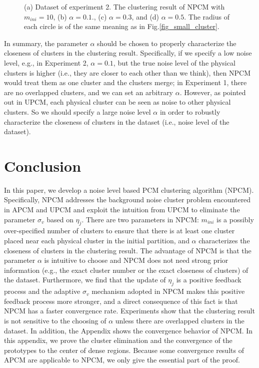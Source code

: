 \documentclass[conference]{IEEEtran}
\theoremstyle{definition}
\begin{document}
\begin{figure}[tb]
\caption{(a) Dataset of experiment 2. The clustering result of NPCM with $m_{ini}=10$, (b) $\alpha=0.1.$, (c) $\alpha=0.3$, and (d) $\alpha=0.5$.
The radius of each circle is of the same meaning as in Fig.\ref{fig_small_cluster}.}
\label{fig_close_cluster}
\end{figure}

In summary, the parameter $\alpha$ should be chosen to  properly characterize the closeness of clusters in the clustering result. Specifically, if we specify a low noise level, e.g., in Experiment 2, $\alpha=0.1$, but the true noise level of the physical clusters is higher (i.e., they are closer to each other than we think), then NPCM would treat them as one cluster and the clusters merge; in Experiment 1, there are no overlapped clusters, and we can set an arbitrary $\alpha$.
However, as pointed out in UPCM, each physical cluster can be seen as noise to other physical clusters. So we should specify a large noise level $\alpha$ in order to robustly characterize the closeness of clusters in the dataset (i.e., noise level of the dataset).
\section{Conclusion}
\label{sec-5}
In this paper, we develop a noise level based PCM clustering algorithm (NPCM). Specifically, NPCM addresses the background noise cluster problem encountered in APCM and UPCM and exploit the intuition from UPCM to eliminate the parameter $\sigma_v$ based on $\eta_j$.
There are two parameters in NPCM: $m_{ini}$ is a possibly over-specified number of clusters to ensure that there is at least one cluster placed near each physical cluster in the initial partition, and $\alpha$ characterizes the closeness of clusters in the clustering result.
The advantage of NPCM is that the parameter $\alpha$ is intuitive to choose and NPCM does not need strong prior information (e.g., the exact cluster number or the exact closeness of clusters) of the dataset.
Furthermore, we find that the update of $\eta_j$ is a positive feedback process and the adaptive $\sigma_v$ mechanism adopted in NPCM makes this positive feedback process more stronger, and a direct consequence of this fact is that NPCM has a faster convergence rate. 
Experiments show that the clustering result is not sensitive to the choosing of $\alpha$ unless there are overlapped clusters in the dataset.
In addition, the Appendix shows the convergence behavior of NPCM.
\appendix
In this appendix, we prove the cluster elimination and the convergence of the prototypes to the center of dense regions. Because some convergence results of APCM \cite{xenaki_novel_2016} are applicable to NPCM, we only give the essential part of the proof. 
\end{document}
